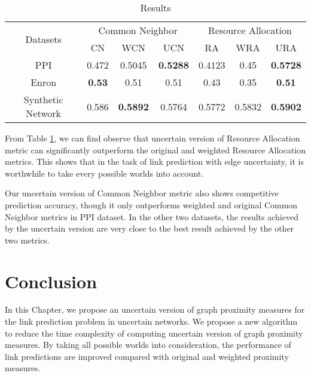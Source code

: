 \documentclass[\main/thesis.tex]{subfiles}
\begin{document}
\begin{table}[]
\centering
\caption{Results}
\label{experiment-result-link}
\begin{tabular}{c|c|c|c||c|c|c}
\hline
\multirow{2}{*}{Datasets} & \multicolumn{3}{c||}{Common Neighbor}              & \multicolumn{3}{c}{Resource Allocation} \\ \cline{2-7} 
                          & CN            & WCN             & UCN             & RA        & WRA      & URA               \\ \hline
PPI                       & 0.472         & 0.5045          & \textbf{0.5288} & 0.4123    & 0.45     & \textbf{0.5728}   \\ \hline
Enron                     & \textbf{0.53} & 0.51            & 0.51            & 0.43      & 0.35     & \textbf{0.51}     \\ \hline
Synthetic Network         & 0.586         & \textbf{0.5892} & 0.5764          & 0.5772    & 0.5832   & \textbf{0.5902}   \\ \hline
\end{tabular}
\end{table}

From Table \ref{experiment-result-link}, we can find observe that uncertain version of Resource Allocation metric can significantly outperform the original and weighted Resource Allocation metrics. This shows that in the task of link prediction with edge uncertainty, it is worthwhile to take every possible worlds into account.

Our uncertain version of Common Neighbor metric also shows competitive prediction accuracy, though it only outperforms weighted and original Common Neighbor metrics in PPI dataset. In the other two datasets, the results achieved by the uncertain version are very close to the best result achieved by the other two metrics.%

\section{Conclusion}
In this Chapter, we propose an uncertain version of graph proximity measures for the link prediction problem in uncertain networks. We propose a new algorithm to reduce the time complexity of computing uncertain version of graph proximity measures. By taking all possible worlds into consideration, the performance of link predictions are improved compared with original and weighted proximity measures.
\end{document}
